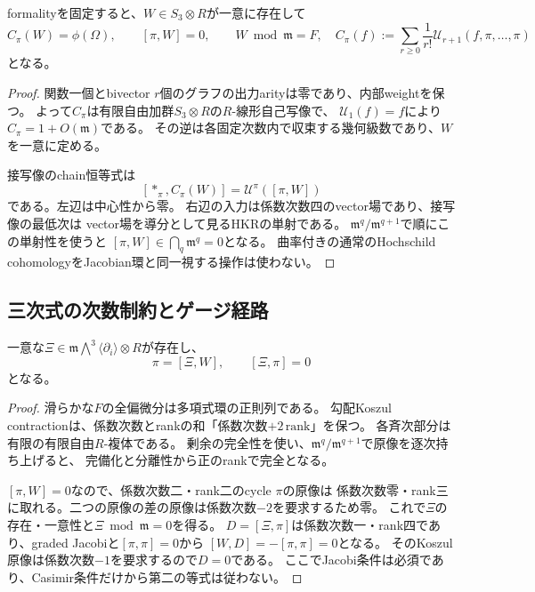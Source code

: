 \begin{lemma}[中心逆像を有限行列で取り出す]\label{cft:lem:center}
formalityを固定すると、$W\in S_3\otimes R$が一意に存在して
\begin{equation}\label{cft:eq:center}
 C_\pi(W)=\phi(\Omega),\qquad [\pi,W]=0,\qquad W\bmod\mathfrak m=F,
 \quad
 C_\pi(f):=\sum_{r\ge0}\frac1{r!}\mathcal U_{r+1}(f,\pi,\ldots,\pi)
\end{equation}
となる。
\end{lemma}
\begin{proof}
関数一個とbivector $r$個のグラフの出力arityは零であり、内部weightを保つ。
よって$C_\pi$は有限自由加群$S_3\otimes R$の$R$-線形自己写像で、
$\mathcal U_1(f)=f$により$C_\pi=1+O(\mathfrak m)$である。
その逆は各固定次数内で収束する幾何級数であり、$W$を一意に定める。

接写像のchain恒等式は
\begin{equation}\label{cft:eq:chain-center}
 [*_\pi,C_\pi(W)]=\mathcal U^\pi([\pi,W])
\end{equation}
である。左辺は中心性から零。
右辺の入力は係数次数四のvector場であり、接写像の最低次は
vector場を導分として見るHKRの単射である。
$\mathfrak m^q/\mathfrak m^{q+1}$で順にこの単射性を使うと
$[\pi,W]\in\bigcap_q\mathfrak m^q=0$となる。
曲率付きの通常のHochschild cohomologyをJacobian環と同一視する操作は使わない。
\end{proof}

\subsection{三次式の次数制約とゲージ経路}
\begin{lemma}[唯一の定数三重vectorと二回目の作用]\label{cft:lem:primitive}
一意な$\Xi\in\mathfrak m\bigwedge^3\langle\partial_i\rangle\otimes R$が存在し、
\begin{equation}\label{cft:eq:primitive}
 \pi=[\Xi,W],\qquad [\Xi,\pi]=0
\end{equation}
となる。
\end{lemma}
\begin{proof}
滑らかな$F$の全偏微分は多項式環の正則列である。
勾配Koszul contractionは、係数次数とrankの和「係数次数$+2\,\mathrm{rank}$」を保つ。
各斉次部分は有限の有限自由$R$-複体である。
剰余の完全性を使い、$\mathfrak m^q/\mathfrak m^{q+1}$で原像を逐次持ち上げると、
完備化と分離性から正のrankで完全となる。

$[\pi,W]=0$なので、係数次数二・rank二のcycle $\pi$の原像は
係数次数零・rank三に取れる。二つの原像の差の原像は係数次数$-2$を要求するため零。
これで$\Xi$の存在・一意性と$\Xi\bmod\mathfrak m=0$を得る。
$D=[\Xi,\pi]$は係数次数一・rank四であり、graded Jacobiと$[\pi,\pi]=0$から
$[W,D]=-[\pi,\pi]=0$となる。
そのKoszul原像は係数次数$-1$を要求するので$D=0$である。
ここでJacobi条件は必須であり、Casimir条件だけから第二の等式は従わない。
\end{proof}

